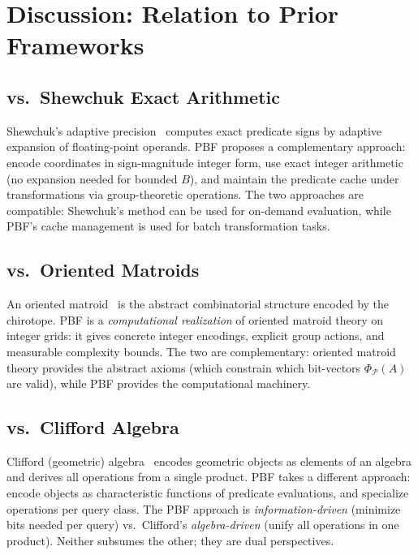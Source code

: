 \documentclass[11pt,letterpaper]{article}
\newcommand{\PhiP}{\Phi_{\mathcal{P}}}
\begin{document}
\section{Discussion: Relation to Prior Frameworks}\label{sec:discussion}

\subsection{vs.\ Shewchuk Exact Arithmetic}

Shewchuk's adaptive precision~\cite{Shewchuk97} computes exact predicate signs by
adaptive expansion of floating-point operands.  PBF proposes a complementary approach:
encode coordinates in sign-magnitude integer form, use exact integer arithmetic (no
expansion needed for bounded $B$), and maintain the predicate cache under transformations
via group-theoretic operations.  The two approaches are compatible: Shewchuk's method
can be used for on-demand evaluation, while PBF's cache management is used for batch
transformation tasks.

\subsection{vs.\ Oriented Matroids}

An oriented matroid~\cite{Bjorner99} is the abstract combinatorial structure encoded
by the chirotope.  PBF is a \emph{computational realization} of oriented matroid theory
on integer grids: it gives concrete integer encodings, explicit group actions, and
measurable complexity bounds.  The two are complementary: oriented matroid theory
provides the abstract axioms (which constrain which bit-vectors $\PhiP(A)$ are valid),
while PBF provides the computational machinery.

\subsection{vs.\ Clifford Algebra}

Clifford (geometric) algebra~\cite{Hestenes84} encodes geometric objects as elements
of an algebra and derives all operations from a single product.  PBF takes a different
approach: encode objects as characteristic functions of predicate evaluations, and
specialize operations per query class.  The PBF approach is \emph{information-driven}
(minimize bits needed per query) vs.\ Clifford's \emph{algebra-driven} (unify all
operations in one product).  Neither subsumes the other; they are dual perspectives.
\end{document}

